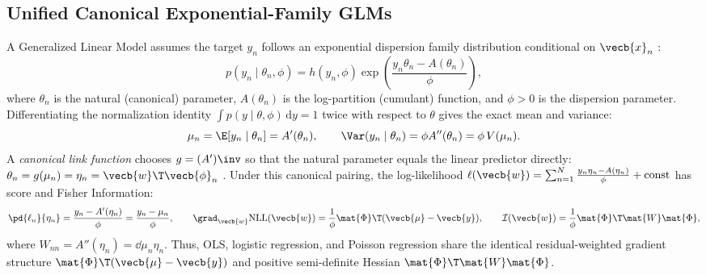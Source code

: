\documentclass[../../../../master.tex]{subfiles}
\begin{document}

\subsection{Unified Canonical Exponential-Family GLMs}
\label{subsec:glm:exponential_family}

\begin{coremath}
A Generalized Linear Model assumes the target $y_n$ follows an exponential dispersion family distribution conditional on $\vecb{x}_n$ :
\begin{equation}
\label{eq:glm:exp_disp}
p(y_n \mid \theta_n, \phi) = h(y_n, \phi)\exp\!\left(\frac{y_n\theta_n - A(\theta_n)}{\phi}\right),
\end{equation}
where $\theta_n$ is the natural (canonical) parameter, $A(\theta_n)$ is the log-partition (cumulant) function, and $\phi > 0$ is the dispersion parameter. Differentiating the normalization identity $\int p(y\mid\theta,\phi)\,\mathrm{d}y = 1$ twice with respect to $\theta$ gives the exact mean and variance:
\begin{equation}
\label{eq:glm:cumulants}
\mu_n = \E[y_n \mid \theta_n] = A'(\theta_n), \qquad \Var(y_n \mid \theta_n) = \phi A''(\theta_n) = \phi\, V(\mu_n).
\end{equation}
A \emph{canonical link function} chooses $g = (A')\inv$ so that the natural parameter equals the linear predictor directly: $\theta_n = g(\mu_n) = \eta_n = \vecb{w}\T\vecb{\phi}_n$ . Under this canonical pairing, the log-likelihood $\ell(\vecb{w}) = \sum_{n=1}^N \frac{y_n\eta_n - A(\eta_n)}{\phi} + \mathrm{const}$ has score and Fisher Information:
\begin{equation}
\label{eq:glm:canonical_score}
\pd{\ell_n}{\eta_n} = \frac{y_n - A'(\eta_n)}{\phi} = \frac{y_n - \mu_n}{\phi}, \qquad
\grad_{\vecb{w}}\mathrm{NLL}(\vecb{w}) = \frac{1}{\phi}\mat{\Phi}\T(\vecb{\mu} - \vecb{y}), \qquad
\mathcal{I}(\vecb{w}) = \frac{1}{\phi}\mat{\Phi}\T\mat{W}\mat{\Phi},
\end{equation}
where $W_{nn} = A''(\eta_n) = \dd{\mu_n}{\eta_n}$. Thus, OLS, logistic regression, and Poisson regression share the identical residual-weighted gradient structure $\mat{\Phi}\T(\vecb{\mu} - \vecb{y})$ and positive semi-definite Hessian $\mat{\Phi}\T\mat{W}\mat{\Phi}$.
\end{coremath}
\end{document}
